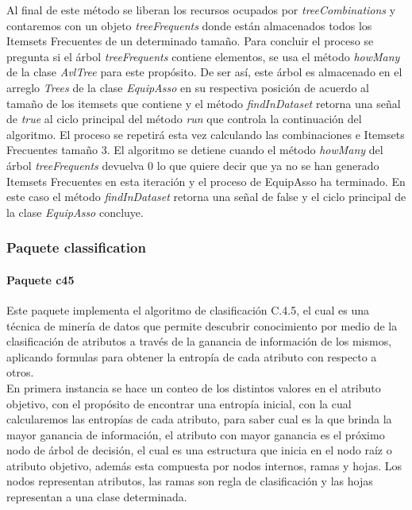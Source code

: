 Al final de este m\'etodo se liberan los recursos ocupados por \textit{treeCombinations} y contaremos con un
objeto \textit{treeFrequents} donde est\'an almacenados todos los Itemsets Frecuentes de un determinado tama\~no.
Para concluir el proceso se pregunta si el \'arbol \textit{treeFrequents} contiene elementos, se usa el m\'etodo
\textit{howMany} de la clase \textit{AvlTree} para este prop\'osito.  De ser as\'i, este \'arbol es almacenado en
el arreglo \textit{Trees} de la clase \textit{EquipAsso} en su respectiva posici\'on de acuerdo al tama\~no de
los itemsets que contiene y el m\'etodo \textit{findInDataset} retorna una se\~nal de \textit{true} al ciclo
principal del m\'etodo \textit{run} que controla la continuaci\'on del algoritmo.  El proceso se repetir\'a esta
vez calculando las combinaciones e Itemsets Frecuentes tama\~no 3.  El algoritmo se detiene cuando el m\'etodo
\textit{howMany} del \'arbol \textit{treeFrequents} devuelva 0 lo que quiere decir que ya no se han generado
Itemsets Frecuentes en esta iteraci\'on y el proceso de EquipAsso ha terminado.  En este caso el m\'etodo
\textit{findInDataset} retorna una se\~nal de false y el ciclo principal de la clase \textit{EquipAsso}
concluye.\\
\subsubsection{Paquete classification}
\paragraph{Paquete c45}
Este paquete implementa el algoritmo de clasificaci\'on C.4.5, el cual es una t\'ecnica de miner\'ia de datos que
permite descubrir conocimiento por medio de la clasificaci\'on de atributos a trav\'es de la ganancia de informaci\'on
de los mismos, aplicando formulas para obtener la entrop\'ia de cada atributo con respecto a otros.\\

En primera instancia se hace un conteo de los distintos valores en el atributo objetivo, con el prop\'osito de
encontrar una entrop\'ia inicial, con la cual calcularemos las entrop\'ias de cada atributo, para saber cual es la
que brinda la mayor ganancia de informaci\'on, el atributo con mayor ganancia es el pr\'oximo nodo de \'arbol de
decisi\'on, el cual es una estructura que inicia en el nodo ra\'iz o atributo objetivo, adem\'as esta compuesta
por nodos internos, ramas y hojas. Los nodos representan atributos, las ramas son regla de clasificaci\'on y las
hojas representan a una clase determinada.\\

